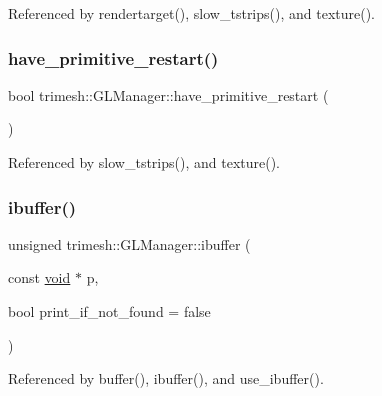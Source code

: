 Referenced by rendertarget(), slow\+\_\+tstrips(), and texture().

\mbox{\label{classtrimesh_1_1GLManager_af13c78d0ae6af5dd2cdf238a1e0c5090}} 
\subsubsection{\texorpdfstring{have\+\_\+primitive\+\_\+restart()}{have\_primitive\_restart()}}
{\footnotesize\ttfamily bool trimesh\+::\+G\+L\+Manager\+::have\+\_\+primitive\+\_\+restart (\begin{DoxyParamCaption}{ }\end{DoxyParamCaption})}



Referenced by slow\+\_\+tstrips(), and texture().

\mbox{\label{classtrimesh_1_1GLManager_aadf7a71b53c652b787863c6826e3f5bb}} 
\subsubsection{\texorpdfstring{ibuffer()}{ibuffer()}\hspace{0.1cm}{\footnotesize\ttfamily [1/2]}}
{\footnotesize\ttfamily unsigned trimesh\+::\+G\+L\+Manager\+::ibuffer (\begin{DoxyParamCaption}\item[{const \hyperlink{namespacetrimesh_a784ddfd979e1c579bda795a8edfc3f43}{void} $\ast$}]{p,  }\item[{bool}]{print\+\_\+if\+\_\+not\+\_\+found = {\ttfamily false} }\end{DoxyParamCaption})}



Referenced by buffer(), ibuffer(), and use\+\_\+ibuffer().

\mbox{\label{classtrimesh_1_1GLManager_a6830bb30902966f62e2696bb49cece03}} 
